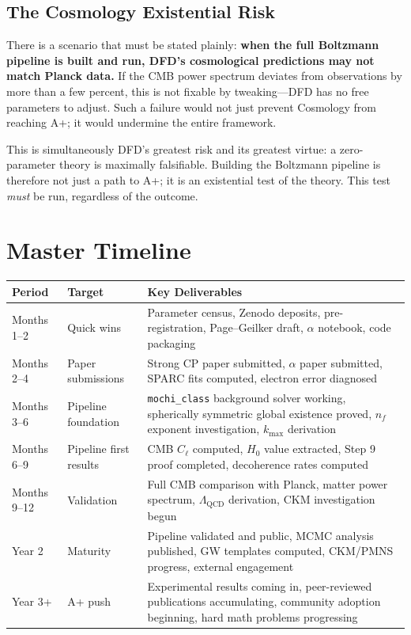 \documentclass[11pt,a4paper]{article}
\begin{document}
\subsection{The Cosmology Existential Risk}
There is a scenario that must be stated plainly: \textbf{when the full Boltzmann pipeline is built and run, DFD's cosmological predictions may not match Planck data.} If the CMB power spectrum deviates from observations by more than a few percent, this is not fixable by tweaking---DFD has no free parameters to adjust. Such a failure would not just prevent Cosmology from reaching A+; it would undermine the entire framework.

This is simultaneously DFD's greatest risk and its greatest virtue: a zero-parameter theory is maximally falsifiable. Building the Boltzmann pipeline is therefore not just a path to A+; it is an existential test of the theory. This test \emph{must} be run, regardless of the outcome.


\section{Master Timeline}

\begin{center}
\begin{tabular}{llp{7cm}}
\toprule
\textbf{Period} & \textbf{Target} & \textbf{Key Deliverables} \\
\midrule
Months 1--2 & Quick wins & Parameter census, Zenodo deposits, pre-registration, Page--Geilker draft, $\alpha$ notebook, code packaging \\
\midrule
Months 2--4 & Paper submissions & Strong CP paper submitted, $\alpha$ paper submitted, SPARC fits computed, electron error diagnosed \\
\midrule
Months 3--6 & Pipeline foundation & \texttt{mochi\_class} background solver working, spherically symmetric global existence proved, $n_f$ exponent investigation, $k_{\max}$ derivation \\
\midrule
Months 6--9 & Pipeline first results & CMB $C_\ell$ computed, $H_0$ value extracted, Step 9 proof completed, decoherence rates computed \\
\midrule
Months 9--12 & Validation & Full CMB comparison with Planck, matter power spectrum, $\Lambda_{\text{QCD}}$ derivation, CKM investigation begun \\
\midrule
Year 2 & Maturity & Pipeline validated and public, MCMC analysis published, GW templates computed, CKM/PMNS progress, external engagement \\
\midrule
Year 3+ & A+ push & Experimental results coming in, peer-reviewed publications accumulating, community adoption beginning, hard math problems progressing \\
\bottomrule
\end{tabular}
\end{center}
\end{document}
